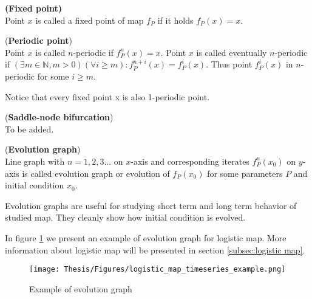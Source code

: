 \begin{definition} \textbf{(Fixed point)} \\
    \label{def:fixed point}
    Point $x$ is called a fixed point of map $f_P$ if it holds $f_P(x) = x$.
\end{definition}

\begin{definition} (\textbf{Periodic point})\\
    Point $x$ is called $n$-periodic if $f^{n}_P(x)=x$. Point $x$ is called eventually $n$-periodic if $(\exists m \in \mathbb{N}, m>0) (\forall i \geq m): f^{n+i}_P(x)=f^{i}_P(x)$.
    Thus point $f^{i}_P(x)$ in $n$-periodic for some $i \geq m$.
\end{definition}

\begin{remark}
    Notice that every fixed point x is also 1-periodic point.  
\end{remark}

\begin{theorem} (\textbf{Saddle-node bifurcation}) \\
    \label{th:saddle_node_bif}
    To be added.
\end{theorem}

\begin{definition} (\textbf{Evolution graph}) \\
    Line graph with $n=1,2,3...$ on $x$-axis and corresponding iterates $f^{n}_P(x_0)$ on $y$-axis is called evolution graph or evolution of $f_{P}(x_0)$ for some parameters $P$ and initial condition $x_0$.
\end{definition}

\begin{remark}
    Evolution graphs are useful for studying short term and long term behavior of studied map.
    They cleanly show how initial condition is evolved.
\end{remark}

\begin{example}
    In figure \ref{fig:evolution_graph_example} we present an example of evolution graph for logistic map. More information about logistic map will be presented in section \ref{subsec:logistic map}.
    \begin{figure}[!h]
        \centering
        \texttt{[image: Thesis/Figures/logistic\_map\_timeseries\_example.png]}
        \caption{Example of evolution graph}
        \label{fig:evolution_graph_example}
    \end{figure}
\end{example}


